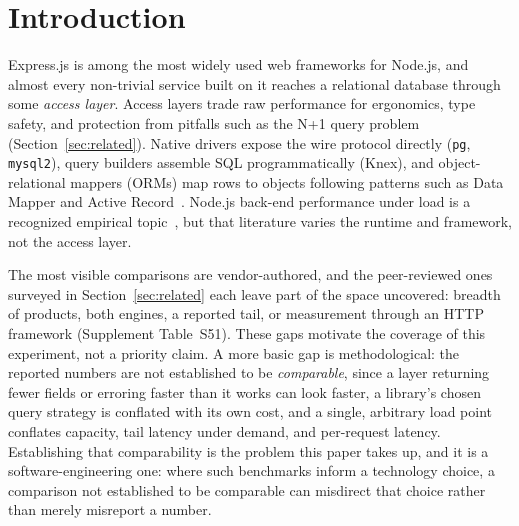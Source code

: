 \section{Introduction}
\label{sec:introduction}

Express.js is among the most widely used web frameworks for Node.js, and almost every non-trivial
service built on it reaches a relational database through some \emph{access layer}. Access layers
trade raw performance for ergonomics, type safety, and protection from pitfalls such as the N+1 query
problem~\cite{chen2014orm} (Section~\ref{sec:related}). Native drivers expose the wire protocol
directly (\texttt{pg}, \texttt{mysql2}), query builders assemble SQL programmatically (Knex), and
object-relational mappers (ORMs) map rows to objects following patterns such as Data Mapper and
Active Record~\cite{fowler2002patterns}. Node.js back-end performance under load is a recognized
empirical topic~\cite{chaniotis2015nodejs,kuffel2025nodejs,carmo2024backend}, but that literature
varies the runtime and framework, not the access layer.

The most visible comparisons are vendor-authored, and the peer-reviewed ones surveyed in
Section~\ref{sec:related} each leave part of the space uncovered: breadth of products, both engines,
a reported tail, or measurement through an HTTP framework (Supplement Table~S51).
These gaps motivate the coverage of this experiment, not a priority claim.
A more basic gap is methodological: the reported numbers are not established to be
\emph{comparable}, since a layer returning fewer fields or erroring faster than it works can look
faster, a library's chosen query strategy is conflated with its own cost, and a single, arbitrary
load point conflates capacity, tail latency under demand, and per-request latency.
Establishing that comparability is the problem this paper takes up, and it is a
software-engineering one: where such benchmarks inform a technology choice, a comparison not
established to be comparable can misdirect that choice rather than merely misreport a number.

